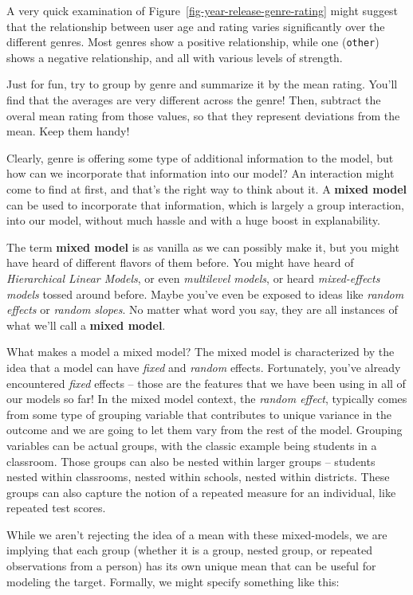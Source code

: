 \documentclass[
  letterpaper,
]{krantz}
\begin{document}
A very quick examination of Figure~\ref{fig-year-release-genre-rating}
might suggest that the relationship between user age and rating varies
significantly over the different genres. Most genres show a positive
relationship, while one (\texttt{other}) shows a negative relationship,
and all with various levels of strength.

Just for fun, try to group by genre and summarize it by the mean rating.
You'll find that the averages are very different across the genre! Then,
subtract the overal mean rating from those values, so that they
represent deviations from the mean. Keep them handy!

Clearly, genre is offering some type of additional information to the
model, but how can we incorporate that information into our model? An
interaction might come to find at first, and that's the right way to
think about it. A \textbf{mixed model} can be used to incorporate that
information, which is largely a group interaction, into our model,
without much hassle and with a huge boost in explanability.

The term \textbf{mixed model} is as vanilla as we can possibly make it,
but you might have heard of different flavors of them before. You might
have heard of \emph{Hierarchical Linear Models}, or even
\emph{multilevel models}, or heard \emph{mixed-effects models} tossed
around before. Maybe you've even be exposed to ideas like \emph{random
effects} or \emph{random slopes}. No matter what word you say, they are
all instances of what we'll call a \textbf{mixed model}.

What makes a model a mixed model? The mixed model is characterized by
the idea that a model can have \emph{fixed} and \emph{random} effects.
Fortunately, you've already encountered \emph{fixed} effects -- those
are the features that we have been using in all of our models so far! In
the mixed model context, the \emph{random effect}, typically comes from
some type of grouping variable that contributes to unique variance in
the outcome and we are going to let them vary from the rest of the
model. Grouping variables can be actual groups, with the classic example
being students in a classroom. Those groups can also be nested within
larger groups -- students nested within classrooms, nested within
schools, nested within districts. These groups can also capture the
notion of a repeated measure for an individual, like repeated test
scores.

While we aren't rejecting the idea of a mean with these mixed-models, we
are implying that each group (whether it is a group, nested group, or
repeated observations from a person) has its own unique mean that can be
useful for modeling the target. Formally, we might specify something
like this:
\end{document}
